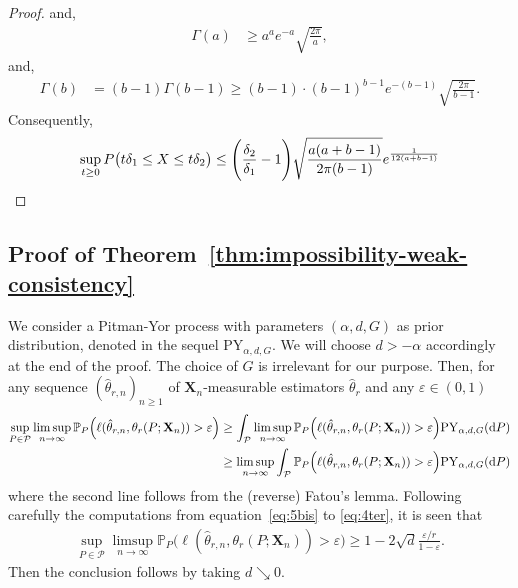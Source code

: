 \documentclass{article}
\newcommand{\1}{\boldsymbol{1}}
\newcommand{\PP}{\mathbb{P}}
\theoremstyle{plain}
\begin{document}
\begin{proof}
  and,
  \begin{align*}
    \Gamma(a)%
    &\geq a^{a}e^{-a}\sqrt{\frac{2\pi}{a}},
  \end{align*}
  and,
  \begin{align*}
    \Gamma(b)%
    &= (b-1)\Gamma(b-1)%
      \geq (b-1)\cdot (b-1)^{b-1}e^{-(b-1)}\sqrt{\frac{2\pi}{b-1}}.
  \end{align*}
  Consequently,
  \begin{equation*}
    \sup_{t\geq 0}P\big(t\delta_1 \leq X \leq t\delta_2 \big)%
    \leq \Bigg(\frac{\delta_2}{\delta_1} - 1 \Bigg)\sqrt{\frac{a(a + b-1)}{2\pi(b-1)}}e^{\frac{1}{12(a+b-1)}}%
    \qedhere
  \end{equation*}
\end{proof}


  \subsection{Proof of Theorem~\ref{thm:impossibility-weak-consistency}}
  \label{sec:proof-theor-weakconsistency}
  We consider a Pitman-Yor process with parameters $(\alpha,d,G)$ as prior distribution, denoted in the sequel $\mathrm{PY}_{\alpha,d,G}$. We will choose $d > -\alpha$ accordingly at the end of the proof. The choice of $G$ is irrelevant for our purpose. Then, for any sequence $(\hat\theta_{r,n})_{n\geq 1}$ of $\mathbf{X}_n$-measurable estimators $\hat{\theta}_r$ and any $\varepsilon \in (0,1)$
  \begin{align*}
    \sup_{P\in \mathcal{P}}\limsup_{n\to\infty}\PP_P\Big( \ell(\hat{\theta}_{r,n},\theta_r(P;\mathbf{X}_n)) > \varepsilon \Big)%
    &\geq \int_{\mathcal{P}} \limsup_{n\to\infty}\PP_P\Big( \ell(\hat{\theta}_{r,n},\theta_r(P;\mathbf{X}_n)) > \varepsilon \Big) \mathrm{PY}_{\alpha,d,G}(\intd P)\\
    &\geq \limsup_{n\to\infty} \int_{\mathcal{P}} \PP_P\Big( \ell(\hat{\theta}_{r,n},\theta_r(P;\mathbf{X}_n)) > \varepsilon \Big) \mathrm{PY}_{\alpha,d,G}(\intd P)
  \end{align*}
  where the second line follows from the (reverse) Fatou's lemma. Following carefully the computations from equation~\eqref{eq:5bis} to \eqref{eq:4ter}, it is seen that
  \begin{align*}
    \sup_{P\in \mathcal{P}}\limsup_{n\to\infty}\PP_P\Big( \ell(\hat{\theta}_{r,n},\theta_r(P;\mathbf{X}_n)) > \varepsilon \Big)%
    \geq 1 - 2\sqrt{d}\frac{\varepsilon/r}{1-\varepsilon}.
  \end{align*}
  Then the conclusion follows by taking $d\searrow 0$.
\end{document}

